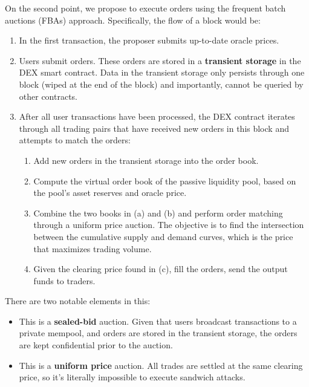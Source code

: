 \documentclass{article}
\begin{document}
On the second point, we propose to execute orders using the frequent batch auctions (FBAs) approach.\supercite{frequentbatchauctions,frequentbatchauctions2} Specifically, the flow of a block would be:

\begin{enumerate}
  \item In the first transaction, the proposer submits up-to-date oracle prices.
  \item Users submit orders. These orders are stored in a \textbf{transient storage} in the DEX smart contract. Data in the transient storage only persists through one block (wiped at the end of the block) and importantly, cannot be queried by other contracts.
  \item After all user transactions have been processed, the DEX contract iterates through all trading pairs that have received new orders in this block and attempts to match the orders:
        \begin{enumerate}
          \item Add new orders in the transient storage into the order book.
          \item Compute the virtual order book of the passive liquidity pool, based on the pool's asset reserves and oracle price.
          \item Combine the two books in (a) and (b) and perform order matching through a uniform price auction.\supercite{uniformpriceauctions} The objective is to find the intersection between the cumulative supply and demand curves, which is the price that maximizes trading volume.
          \item Given the clearing price found in (c), fill the orders, send the output funds to traders.
        \end{enumerate}
\end{enumerate}

There are two notable elements in this:

\begin{itemize}
  \item This is a \textbf{sealed-bid} auction. Given that users broadcast transactions to a private mempool, and orders are stored in the transient storage, the orders are kept confidential prior to the auction.
  \item This is a \textbf{uniform price} auction. All trades are settled at the same clearing price, so it's literally impossible to execute sandwich attacks.
\end{itemize}
\end{document}
